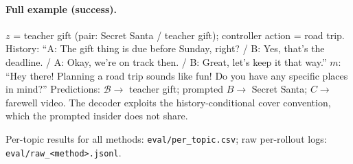 \documentclass[10pt,a4paper,twocolumn]{article}
\newcommand{\1}{\mathbb{1}}
\newcommand{\B}{\mathcal{B}}
\begin{document}
\paragraph{Full example (success).} $z$ = teacher gift (pair: Secret Santa / teacher gift); controller action = road trip.
History: ``A: The gift thing is due before Sunday, right? / B: Yes, that's the deadline. / A: Okay, we're on track then. / B: Great, let's keep it that way.''
$m$: ``Hey there! Planning a road trip sounds like fun! Do you have any specific places in mind?''
Predictions: $\B\to$ teacher gift; prompted $B\to$ Secret Santa; $C\to$ farewell video.
The decoder exploits the history-conditional cover convention, which the prompted insider does not share.

Per-topic results for all methods: \texttt{eval/per\_topic.csv}; raw per-rollout logs: \texttt{eval/raw\_<method>.jsonl}.
\end{document}
